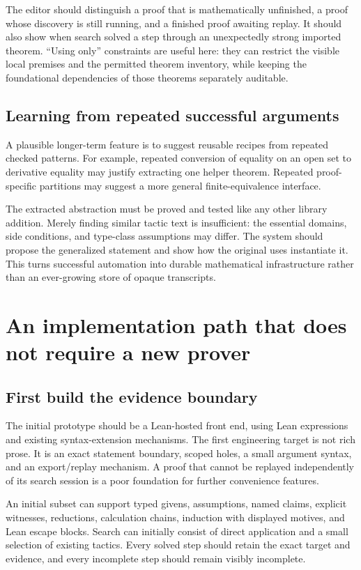 \documentclass[11pt,letterpaper]{article}
\theoremstyle{remark}
\begin{document}
The editor should distinguish a proof that is mathematically unfinished, a proof whose discovery is still running, and a finished proof awaiting replay. It should also show when search solved a step through an unexpectedly strong imported theorem. ``Using only'' constraints are useful here: they can restrict the visible local premises and the permitted theorem inventory, while keeping the foundational dependencies of those theorems separately auditable.

\subsection{Learning from repeated successful arguments}

A plausible longer-term feature is to suggest reusable recipes from repeated checked patterns. For example, repeated conversion of equality on an open set to derivative equality may justify extracting one helper theorem. Repeated proof-specific partitions may suggest a more general finite-equivalence interface.

The extracted abstraction must be proved and tested like any other library addition. Merely finding similar tactic text is insufficient: the essential domains, side conditions, and type-class assumptions may differ. The system should propose the generalized statement and show how the original uses instantiate it. This turns successful automation into durable mathematical infrastructure rather than an ever-growing store of opaque transcripts.

\section{An implementation path that does not require a new prover}
\label{sec:implementation}

\subsection{First build the evidence boundary}

The initial prototype should be a Lean-hosted front end, using Lean expressions and existing syntax-extension mechanisms. The first engineering target is not rich prose. It is an exact statement boundary, scoped holes, a small argument syntax, and an export/replay mechanism. A proof that cannot be replayed independently of its search session is a poor foundation for further convenience features.

An initial subset can support typed givens, assumptions, named claims, explicit witnesses, reductions, calculation chains, induction with displayed motives, and Lean escape blocks. Search can initially consist of direct application and a small selection of existing tactics. Every solved step should retain the exact target and evidence, and every incomplete step should remain visibly incomplete.
\end{document}
